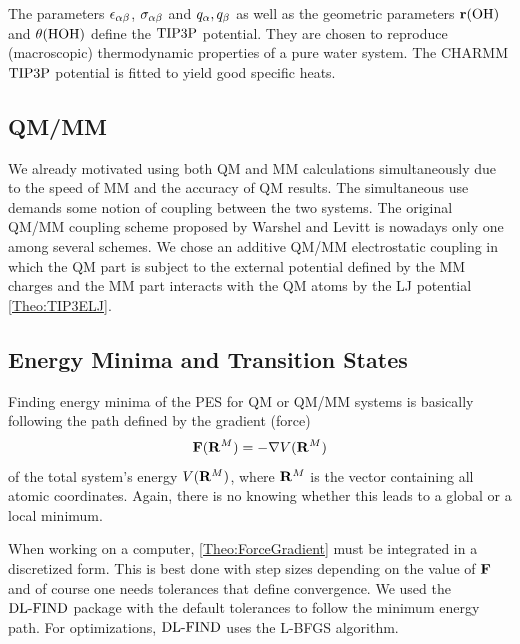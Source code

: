 The parameters $\epsilon_{\alpha\beta}$, $\sigma_{\alpha\beta}$ and $q_{\alpha}, q_{\beta}$ as well as the geometric parameters
$\mathbf{r}(\text{OH})$ and $\theta(\text{HOH})$ define the $\text{TIP3P}$ potential. They are chosen to reproduce
(macroscopic) thermodynamic properties of a pure water system.
The CHARMM $\text{TIP3P}$
potential is fitted to yield good specific heats.\cite{MacKerell1998CHARMMTIP3}

\subsection{QM/MM}
\label{Sec:Theo:QMMM}

We already motivated using both QM and MM calculations simultaneously due to
the speed of MM and the accuracy of QM results. The simultaneous use
demands some notion of coupling between the two systems. The original
QM/MM coupling scheme proposed by Warshel and Levitt \cite{Warshel1976QMMM}
is nowadays only one among several schemes.
We chose an additive QM/MM electrostatic coupling
in which the QM part is subject to the external potential defined
by the MM charges and the MM part interacts with the QM atoms by
the LJ potential \eqref{Theo:TIP3ELJ}.

\subsection{Energy Minima and Transition States}
\label{Sec:Theo:Minima}
Finding energy minima of the PES for QM or QM/MM systems is basically following
the path defined by the gradient (force)
\newcommand\RM{\enmat{\bo R^M}}
\begin{equation}
\bo F(\RM)=-\nabla V(\RM)
\label{Theo:ForceGradient}
\end{equation}
of the total system's energy $V(\RM)$, where $\RM$ is the vector containing
all atomic coordinates. Again, there is no knowing whether this leads to
a global or a local minimum.

When working on a computer, \eqref{Theo:ForceGradient} must be integrated
in a discretized form. This is best done with step sizes depending on the
value of $\mathbf{F}$ and of course one needs tolerances that define convergence.
We used the $\text{DL-FIND}$ package with the default tolerances
to follow the minimum energy path.\cite{Kaestner2009} For
optimizations, $\text{DL-FIND}$ uses the L-BFGS algorithm.\cite{LiuNocedal1989}

